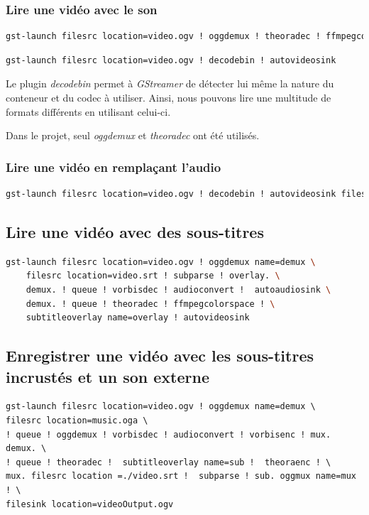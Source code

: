 \documentclass[a4paper, 11pt]{article}
\begin{document}
	\subsubsection{Lire une vidéo avec le son}
	\begin{lstlisting}[numbers=none,language=sh, caption=Lire une vidéo -- Uniquement pour les fichier \texttt{.ogv}]
gst-launch filesrc location=video.ogv ! oggdemux ! theoradec ! ffmpegcolorspace ! autovideosink
	\end{lstlisting}
	\begin{lstlisting}[numbers=none,language=sh, caption=Lire une vidéo -- Pour tous les formats audio-vidéos]
gst-launch filesrc location=video.ogv ! decodebin ! autovideosink
	\end{lstlisting}
	\begin{remarque}
		Le plugin \textit{decodebin} permet à \textit{GStreamer} de détecter lui même la nature du conteneur et du codec à utiliser. Ainsi, nous pouvons lire une multitude de
		formats différents en utilisant celui-ci.

		Dans le projet, seul \textit{oggdemux} et \textit{theoradec} ont été utilisés.
	\end{remarque}
	\subsubsection{Lire une vidéo en remplaçant l'audio}
	\begin{lstlisting}[language=sh, caption=Lire une vidéo avec le son de source différente]
gst-launch filesrc location=video.ogv ! decodebin ! autovideosink filesrc location=Thunderstruck.ogg ! decodebin ! autoaudiosink
	\end{lstlisting}
	\subsection{Lire une vidéo avec des sous-titres}
	\begin{lstlisting}[language=Bash, caption=Lire une vidéo avec des sous-titres \texttt{.srt}]	
gst-launch filesrc location=video.ogv ! oggdemux name=demux \ 
	filesrc location=video.srt ! subparse ! overlay. \
	demux. ! queue ! vorbisdec ! audioconvert !  autoaudiosink \
	demux. ! queue ! theoradec ! ffmpegcolorspace ! \
	subtitleoverlay name=overlay ! autovideosink
\end{lstlisting}
	\subsection{Enregistrer une vidéo avec les sous-titres incrustés et un son externe}
	\begin{lstlisting}[language=Sh, caption=Enregistrer une vidéo avec l'audio \texttt{music.oga}\, l'image \texttt{video.ogv} et les sous-titres]
gst-launch filesrc location=video.ogv ! oggdemux name=demux \
filesrc location=music.oga \
! queue ! oggdemux ! vorbisdec ! audioconvert ! vorbisenc ! mux. demux. \
! queue ! theoradec !  subtitleoverlay name=sub !  theoraenc ! \
mux. filesrc location =./video.srt !  subparse ! sub. oggmux name=mux ! \
filesink location=videoOutput.ogv
	\end{lstlisting}
\end{document}
